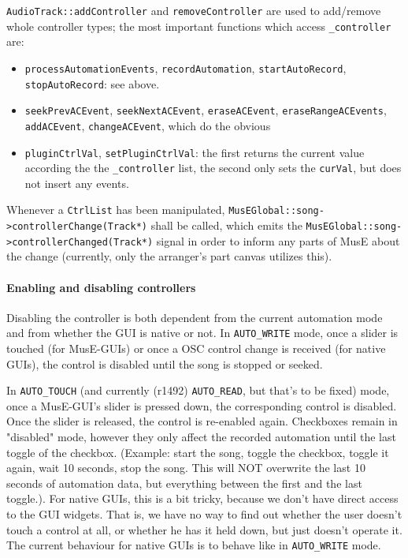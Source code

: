 \documentclass[a4paper]{report}
\begin{document}
\texttt{AudioTrack::addController} and \texttt{removeController} are used %
to add/remove whole controller types; the most important functions which
access \texttt{\_controller} are:
\begin{itemize}
\item \texttt{processAutomationEvents}, \texttt{recordAutomation},
      \texttt{startAutoRecord}, \texttt{stopAutoRecord}: see above.
\item \texttt{seekPrevACEvent}, \texttt{seekNextACEvent}, \texttt{eraseACEvent},
      \texttt{eraseRangeACEvents}, \texttt{addACEvent}, \texttt{changeACEvent},
      which do the obvious
\item \texttt{pluginCtrlVal}, \texttt{setPluginCtrlVal}: the first
      returns the current value according the the \texttt{\_controller}
      list, the second only sets the \texttt{curVal}, but does not
      insert any events.
\end{itemize}

Whenever a \texttt{CtrlList} has been manipulated,
\texttt{MusEGlobal::song->controllerChange(Track*)} shall be called,
which emits the \texttt{MusEGlobal::song->controllerChanged(Track*)}
signal in order to inform any parts of MusE about the change (currently,
only the arranger's part canvas utilizes this).

\paragraph{Enabling and disabling controllers}
Disabling the controller is both dependent from the current automation
mode and from whether the GUI is native or not.
In \texttt{AUTO\_WRITE} mode, once a slider is touched (for MusE-GUIs) or
once a OSC control change is received (for native GUIs), the control
is disabled until the song is stopped or seeked.

In \texttt{AUTO\_TOUCH} (and currently (r1492) \texttt{AUTO\_READ}, but
that's to be fixed) mode, once a MusE-GUI's slider is pressed down, the
corresponding control is disabled. Once the slider is released, the
control is re-enabled again. Checkboxes remain in "disabled" mode,
however they only affect the recorded automation until the last toggle
of the checkbox. (Example: start the song, toggle the checkbox, toggle
it again, wait 10 seconds, stop the song. This will NOT overwrite the
last 10 seconds of automation data, but everything between the first
and the last toggle.). For native GUIs, this is a bit tricky, because
we don't have direct access to the GUI widgets. That is, we have no
way to find out whether the user doesn't touch a control at all, or
whether he has it held down, but just doesn't operate it. The current
behaviour for native GUIs is to behave like in \texttt{AUTO\_WRITE} mode.
\end{document}

